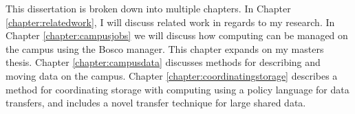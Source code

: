 This dissertation is broken down into multiple chapters.  In Chapter \ref{chapter:relatedwork}, I will discuss related work in regards to my research.  In Chapter \ref{chapter:campusjobs} we will discuss how computing can be managed on the campus using the Bosco manager.  This chapter expands on my masters thesis.  Chapter \ref{chapter:campusdata} discusses methods for describing and moving data on the campus.  Chapter \ref{chapter:coordinatingstorage} describes a method for coordinating storage with computing using a policy language for data transfers, and includes a novel transfer technique for large shared data.




